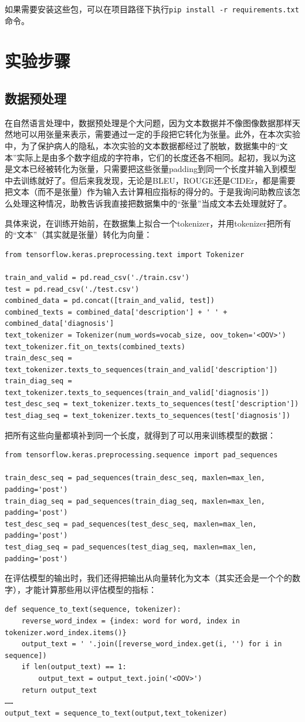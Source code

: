\documentclass{article}
\begin{document}
如果需要安装这些包，可以在项目路径下执行\lstinline|pip install -r requirements.txt|命令。
\section{实验步骤}
\subsection{数据预处理}
在自然语言处理中，数据预处理是个大问题，因为文本数据并不像图像数据那样天然地可以用张量来表示，需要通过一定的手段把它转化为张量。此外，在本次实验中，为了保护病人的隐私，本次实验的文本数据都经过了脱敏，数据集中的“文本”实际上是由多个数字组成的字符串，它们的长度还各不相同。起初，我以为这是文本已经被转化为张量，只需要把这些张量padding到同一个长度并输入到模型中去训练就好了。但后来我发现，无论是BLEU，ROUGE还是CIDEr，都是需要把文本（而不是张量）作为输入去计算相应指标的得分的。于是我询问助教应该怎么处理这种情况，助教告诉我直接把数据集中的“张量”当成文本去处理就好了。

具体来说，在训练开始前，在数据集上拟合一个tokenizer，并用tokenizer把所有的“文本”（其实就是张量）转化为向量：
\begin{lstlisting}
from tensorflow.keras.preprocessing.text import Tokenizer

train_and_valid = pd.read_csv('./train.csv')
test = pd.read_csv('./test.csv')
combined_data = pd.concat([train_and_valid, test])
combined_texts = combined_data['description'] + ' ' + combined_data['diagnosis']
text_tokenizer = Tokenizer(num_words=vocab_size, oov_token='<OOV>')
text_tokenizer.fit_on_texts(combined_texts)
train_desc_seq = text_tokenizer.texts_to_sequences(train_and_valid['description'])
train_diag_seq = text_tokenizer.texts_to_sequences(train_and_valid['diagnosis'])
test_desc_seq = text_tokenizer.texts_to_sequences(test['description'])
test_diag_seq = text_tokenizer.texts_to_sequences(test['diagnosis'])
\end{lstlisting}
把所有这些向量都填补到同一个长度，就得到了可以用来训练模型的数据：
\begin{lstlisting}
from tensorflow.keras.preprocessing.sequence import pad_sequences

train_desc_seq = pad_sequences(train_desc_seq, maxlen=max_len, padding='post')
train_diag_seq = pad_sequences(train_diag_seq, maxlen=max_len, padding='post')
test_desc_seq = pad_sequences(test_desc_seq, maxlen=max_len, padding='post')
test_diag_seq = pad_sequences(test_diag_seq, maxlen=max_len, padding='post')
\end{lstlisting}
在评估模型的输出时，我们还得把输出从向量转化为文本（其实还会是一个个的数字），才能计算那些用以评估模型的指标：
\begin{lstlisting}
def sequence_to_text(sequence, tokenizer):
    reverse_word_index = {index: word for word, index in tokenizer.word_index.items()}
    output_text = ' '.join([reverse_word_index.get(i, '') for i in sequence])
    if len(output_text) == 1:
        output_text = output_text.join('<OOV>')
    return output_text
……
output_text = sequence_to_text(output,text_tokenizer)
\end{lstlisting}
\end{document}
